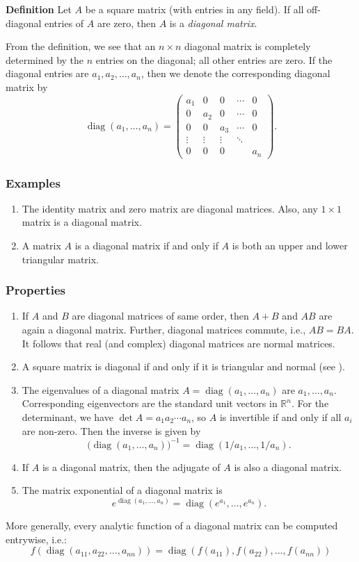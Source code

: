 \documentclass[12pt]{article}
\newcommand{\sR}[0]{\mathbb{R}}
\newcommand{\diag}[0]{\operatorname{diag}}
\begin{document}
{\bf Definition}
Let $A$ be a square matrix (with entries in any field).
If all off-diagonal entries of $A$ are zero, then $A$ is a 
\emph{diagonal matrix}. 

From the definition, we see that an $n\times n$ diagonal matrix is 
completely determined by the $n$ entries on the diagonal; all other entries
are zero. If the diagonal entries are $a_1, a_2, \ldots, a_n$, 
then we denote the corresponding diagonal matrix by 
$$ \diag(a_1,\ldots, a_n) = \begin{pmatrix}
 a_{1} & 0 & 0      &  \cdots &  0      \\
 0 & a_{2} & 0      & \cdots & 0      \\
 0 & 0 & a_{3} & \cdots &  0       \\
 \vdots & \vdots & \vdots & \ddots &  \\
 0 & 0 & 0 &        & a_{n}
 \end{pmatrix}. $$

\subsubsection*{Examples}
\begin{enumerate}
\item The identity matrix and zero matrix are diagonal matrices. Also, 
 any $1\times 1$ matrix is a diagonal matrix.
\item A matrix $A$ is a diagonal matrix if and only if $A$ is 
both an upper and lower triangular matrix. 
\end{enumerate}

\subsubsection*{Properties}
\begin{enumerate}
\item If $A$ and $B$ are diagonal matrices of same order, then 
$A+B$ and $AB$ are again a diagonal matrix. Further, diagonal matrices
commute, i.e., $AB=BA$. It follows that real (and complex)
diagonal matrices are normal matrices. 
\item A square matrix is diagonal if and only if it is 
triangular and normal (see ).
\item The eigenvalues of a diagonal matrix 
$A=\diag(a_1,\ldots, a_n)$ are $a_1, \ldots, a_n$. 
Corresponding eigenvectors are the standard unit vectors in $\sR^n$.
For the determinant, we have $\det A = a_1 a_2 \cdots a_n$, so 
$A$ is invertible if and only if all $a_i$ are non-zero. 
Then the inverse is given by
$$ 
  \big( \diag(a_1,\ldots, a_n)\big)^{-1} = \diag(1/a_1, \ldots, 1/a_n).
$$
\item If $A$ is a diagonal matrix, then the adjugate of $A$ is also a diagonal matrix.
\item The matrix exponential of a diagonal matrix is
$$
  e^{\diag(a_1,\ldots, a_n)} = \diag(e^{a_1}, \ldots, e^{a_n}).
$$ 
\end{enumerate}
More generally, every analytic function of a diagonal matrix can be computed entrywise, i.e.:
\[ f(\diag(a_{11},a_{22},...,a_{nn}))= \diag(f(a_{11}),f(a_{22}),...,f(a_{nn})) \]
\end{document}
